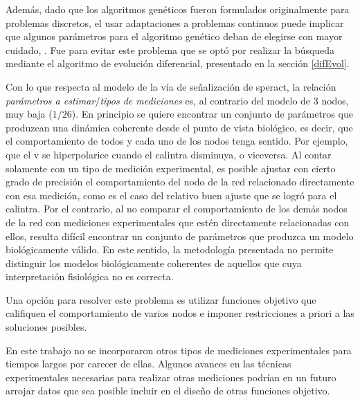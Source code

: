 Además, dado que los algoritmos genéticos fueron formulados originalmente para problemas discretos, el usar adaptaciones a problemas continuos puede implicar que algunos parámetros para el algoritmo genético deban de elegirse con mayor cuidado,  \citeauthor{Haupt1998} \citep{Haupt1998}. Fue para evitar este problema que se optó por realizar la búsqueda mediante el algoritmo de evolución diferencial, presentado en la sección \ref{difEvol}.


Con lo que respecta al modelo de la vía de señalización de speract, la relación \emph{parámetros a estimar}/\emph{tipos de mediciones} es, al contrario del modelo de 3 nodos, muy baja ($1/26$). En principio se quiere encontrar un conjunto de parámetros que produzcan una dinámica coherente desde el punto de vista biológico, es decir, que el comportamiento de todos y cada uno de los nodos tenga sentido. Por ejemplo, que el \acf{v} se hiperpolarice cuando el \acf{calintra} disminuya, o viceversa. Al contar solamente con un tipo de medición experimental, es posible ajustar con cierto grado de precisión el comportamiento del nodo de la red relacionado directamente con esa medición, como es el caso del relativo buen ajuste que se logró para el \ac{calintra}. Por el contrario, al no comparar el comportamiento de los demás nodos de la red con mediciones experimentales que estén directamente relacionadas con ellos, resulta difícil encontrar un conjunto de parámetros que produzca un modelo biológicamente válido. En este sentido, la metodología presentada no permite distinguir los modelos biológicamente coherentes de aquellos que cuya interpretación fisiológica no es correcta.


Una opción para resolver este problema es utilizar funciones objetivo que califiquen el comportamiento de varios nodos e imponer restricciones a priori a las soluciones posibles. 

En este trabajo no se incorporaron otros tipos de mediciones experimentales para tiempos largos por carecer de ellas. Algunos avances en las técnicas experimentales necesarias para realizar otras mediciones podrían en un futuro arrojar datos que sea posible incluir en el diseño de otras funciones objetivo.

